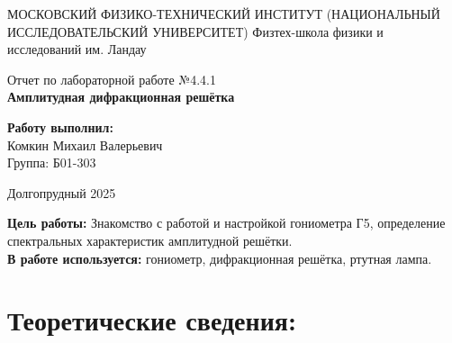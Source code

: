 \documentclass[a4paper, 12pt]{article}
\begin{document}
\begin{titlepage}
        \begin{center}
		{\large МОСКОВСКИЙ ФИЗИКО-ТЕХНИЧЕСКИЙ ИНСТИТУТ (НАЦИОНАЛЬНЫЙ ИССЛЕДОВАТЕЛЬСКИЙ УНИВЕРСИТЕТ)}
		{\large Физтех-школа физики и исследований им. Ландау}
	\end{center}
	
	
	\vspace{4.5cm}
	{\huge
		\begin{center}
			Отчет по лабораторной работе №4.4.1 \\
                \textbf{Амплитудная дифракционная решётка}\\
		\end{center}
	}
	\vspace{2cm}
	\begin{flushright} %
		\begin{minipage}{0.3\textwidth} %
			\begin{flushleft} %

				\large\textbf{Работу выполнил:}\\
				\large {Комкин Михаил Валерьевич} \\
				\large {Группа: Б01-303} \\

			\end{flushleft}
		\end{minipage}
	\end{flushright}
	\vspace{8cm}
	\begin{center}
            
		Долгопрудный 2025
	\end{center}
\end{titlepage}

\textbf{Цель работы:}
Знакомство с работой и настройкой гониометра Г5,
определение спектральных характеристик амплитудной решётки. \\ 

    \textbf{В работе используется:}
гониометр, дифракционная решётка,
ртутная лампа.
\section{Теоретические сведения:}
\end{document}

